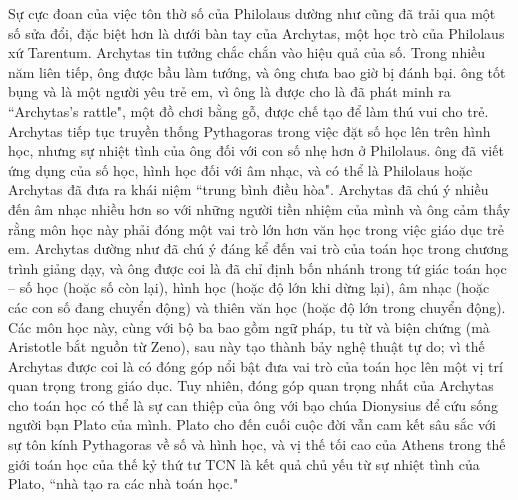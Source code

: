 \begin{multicols}{2}
	\vskip 0.05cm
	Sự cực đoan của việc tôn thờ số của Philolaus dường như cũng đã trải qua một số sửa đổi, đặc biệt hơn là dưới bàn tay của Archytas, một học trò của Philolaus xứ Tarentum. 
	\vskip 0.05cm
	Archytas tin tưởng chắc chắn vào hiệu quả của số. Trong nhiều năm liên tiếp, ông được bầu làm tướng, và ông chưa bao giờ bị đánh bại. ông tốt bụng và là một người yêu trẻ em, vì ông là được cho là đã phát minh ra ``Archytas’s rattle", một đồ chơi bằng gỗ, được chế tạo để làm thú vui cho trẻ. Archytas tiếp tục truyền thống Pythagoras trong việc đặt số học lên trên hình học, nhưng sự nhiệt tình của ông đối với con số nhẹ hơn ở Philolaus.  ông đã viết ứng dụng của số học, hình học đối với âm nhạc, và có thể là Philolaus hoặc Archytas đã đưa ra khái niệm ``trung bình điều hòa". 
	\vskip 0.05cm
	Archytas đã chú ý nhiều đến âm nhạc nhiều hơn so với những người tiền nhiệm của mình và ông cảm thấy rằng môn học này phải đóng một vai trò lớn hơn văn học trong việc giáo dục trẻ em. Archytas dường như đã chú ý đáng kể đến vai trò của toán học trong chương trình giảng dạy, và ông được coi là đã chỉ định bốn nhánh trong tứ giác toán học -- số học (hoặc số còn lại), hình học (hoặc độ lớn khi dừng lại), âm nhạc (hoặc các con số đang chuyển động) và thiên văn học (hoặc độ lớn trong chuyển động). Các môn học này, cùng với bộ ba bao gồm ngữ pháp, tu từ và biện chứng (mà Aristotle bắt nguồn từ Zeno), sau này tạo thành bảy nghệ thuật tự do; vì thế Archytas được coi là có đóng góp nổi bật đưa vai trò của toán học lên một vị trí quan trọng trong giáo dục. 
	\vskip 0.05cm
	Tuy nhiên, đóng góp quan trọng nhất của Archytas cho toán học có thể là sự can thiệp của ông với bạo chúa Dionysius để cứu sống người bạn Plato của mình. Plato cho đến cuối cuộc đời vẫn cam kết sâu sắc với sự tôn kính Pythagoras về số và hình học, và vị thế tối cao của Athens trong thế giới toán học của thế kỷ thứ tư TCN là kết quả chủ yếu từ sự nhiệt tình của Plato, ``nhà tạo ra các nhà toán học." 
	\begin{figure}[H]
		\vspace*{-5pt}
		\centering
		\captionsetup{labelformat= empty, justification=centering}

\end{figure}
\end{multicols}

